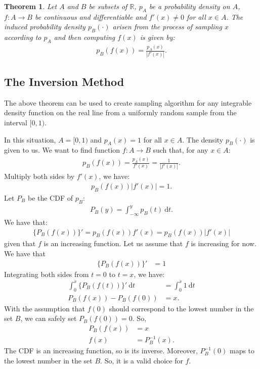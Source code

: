 \documentclass[10pt]{article}
\newtheorem{theorem}[lemma]{Theorem}
\newcommand{\dee}{\mathrm{d}}
\newcommand{\ra}{\rightarrow}
\newcommand{\Real}{\mathbb{R}}
\begin{document}
  \begin{theorem}
  	Let $A$ and $B$ be subsets of $\Real$, $p_A$ be a probability density on $A$, $f: A \ra B$ be continuous and differentiable and $f'(x) \neq 0$ for all $x \in A$.  The induced probability density $p_B(\cdot)$ arisen from the process of sampling $x$ according to $p_A$ and then computing $f(x)$ is given by:
  	\begin{align*}
  		p_B(f(x)) = \frac{p_A(x)}{|f'(x)|}.
  	\end{align*}
  \end{theorem}

  \subsection{The Inversion Method}
  The above theorem can be used to create sampling algorithm for any integrable density function on the real line from a uniformly random sample from the interval $[0,1)$.

  In this situation, $A = [0,1)$ and $p_A(x) = 1$ for all $x \in A$.  The density $p_B(\cdot)$ is given to us.  We want to find function $f: A \ra B$ such that, for any $x \in A$:
  \begin{align*}
  	p_B(f(x)) = \frac{p_A(x)}{f'(x)} = \frac{1}{|f'(x)|}.
  \end{align*}
  Multiply both sides by $f'(x)$, we have:
  \begin{align*}
  	p_B(f(x)) |f'(x)| = 1.
  \end{align*}
  Let $P_B$ be the CDF of $p_B$:
  \begin{align*}
  	P_B(y) = \int_{-\infty}^y p_B(t)\ \dee t.
  \end{align*}  
  We have that:
  \begin{align*}
  	\{ P_B(f(x)) \}' = p_B(f(x))f'(x) = p_B(f(x)) |f'(x)|
  \end{align*}
  given that $f$ is an increasing function.  Let us assume that $f$ is increasing for now.  We have that
  \begin{align*}
  	\{ P_B(f(x)) \}' &= 1
  \end{align*}
  Integrating both sides from $t=0$ to $t=x$, we have:
  \begin{align*}
  	\int_{0}^x \{ P_B(f(t)) \}'\ \dee t &= \int_{0}^x 1\ \dee t\\
  	P_B(f(x)) - P_B(f(0)) &= x.
  \end{align*}
  With the assumption that $f(0)$ should correspond to the lowest number in the set $B$, we can safely set $P_B(f(0)) = 0$.  So,
  \begin{align*}
  	P_B(f(x)) &= x \\
  	f(x) &= P_B^{-1}(x).
  \end{align*}
  The CDF is an increasing function, so is its inverse.  Moreover, $P^{-1}_B(0)$ maps to the lowest number in the set $B$.  So, it is a valid choice for $f$.
\end{document}
